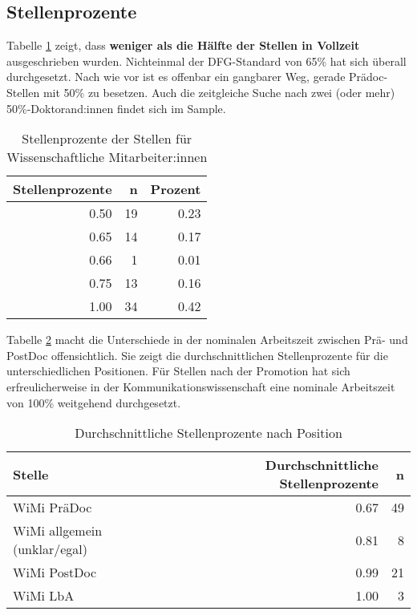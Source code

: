 \documentclass[
]{article}
\begin{document}
\hypertarget{stellenprozente}{%
\subsection{Stellenprozente}\label{stellenprozente}}

Tabelle \ref{tab:wimipercent} zeigt, dass \textbf{weniger als die Hälfte der Stellen in Vollzeit} ausgeschrieben wurden. Nichteinmal der DFG-Standard von 65\% hat sich überall durchgesetzt. Nach wie vor ist es offenbar ein gangbarer Weg, gerade Prädoc-Stellen mit 50\% zu besetzen. Auch die zeitgleiche Suche nach zwei (oder mehr) 50\%-Doktorand:innen findet sich im Sample.

\begin{table}[H]

\caption{\label{tab:wimipercent}Stellenprozente der Stellen für Wissenschaftliche Mitarbeiter:innen}
\centering
\begin{tabular}[t]{r|r|r}
\hline
Stellenprozente & n & Prozent\\
\hline
0.50 & 19 & 0.23\\
\hline
0.65 & 14 & 0.17\\
\hline
0.66 & 1 & 0.01\\
\hline
0.75 & 13 & 0.16\\
\hline
1.00 & 34 & 0.42\\
\hline
\end{tabular}
\end{table}

Tabelle \ref{tab:wimimeanperc} macht die Unterschiede in der nominalen Arbeitszeit zwischen Prä- und PostDoc offensichtlich. Sie zeigt die durchschnittlichen Stellenprozente für die unterschiedlichen Positionen. Für Stellen nach der Promotion hat sich erfreulicherweise in der Kommunikationswissenschaft eine nominale Arbeitszeit von 100\% weitgehend durchgesetzt.

\begin{table}[H]

\caption{\label{tab:wimimeanperc}Durchschnittliche Stellenprozente nach Position}
\centering
\begin{tabular}[t]{l|r|r}
\hline
Stelle & Durchschnittliche Stellenprozente & n\\
\hline
WiMi PräDoc & 0.67 & 49\\
\hline
WiMi allgemein (unklar/egal) & 0.81 & 8\\
\hline
WiMi PostDoc & 0.99 & 21\\
\hline
WiMi LbA & 1.00 & 3\\
\hline
\end{tabular}
\end{table}
\end{document}
